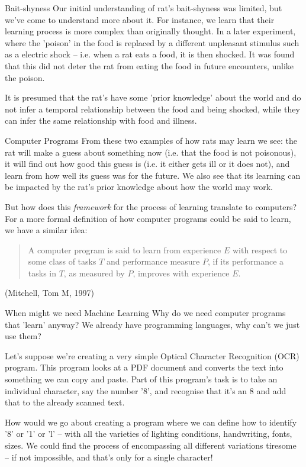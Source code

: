 \documentclass[10pt]{beamer}
\begin{document}
\begin{frame}[label={sec:orga29acbd}]{Bait-shyness}
Our initial understanding of rat's bait-shyness was limited, but we've come to
understand more about it. For instance, we learn that their learning process is more
complex than originally thought. In a later experiment, where the 'poison' in the
food is replaced by a different unpleasant stimulus such as a electric shock --
i.e. when a rat eats a food, it is then shocked. It was found that this did not
deter the rat from eating the food in future encounters, unlike the poison.

It is presumed that the rat's have some 'prior knowledge' about the world and do not
infer a temporal relationship between the food and being shocked, while they can
infer the same relationship with food and illness.
\end{frame}

\begin{frame}[label={sec:org61f7819}]{Computer Programs}
From these two examples of how rats may learn we see: the rat will make a guess about
something now (i.e. that the food is not poisonous), it will find out how good this
guess is (i.e. it either gets ill or it does not), and learn from how well its guess
was for the future. We also see that its learning can be impacted by the rat's prior
knowledge about how the world may work.

But how does this \emph{framework} for the process of learning translate to computers? For a
more formal definition of how computer programs could be said to learn, we have a
similar idea:

\begin{quote}
A computer program is said to learn from experience \(E\) with respect
to some class of tasks \(T\) and performance measure \(P\), if its performance
a tasks in \(T\), as measured by \(P\), improves with experience \(E\).
\end{quote}

(Mitchell, Tom M, 1997)
\end{frame}

\begin{frame}[label={sec:org7779646}]{When might we need Machine Learning}
Why do we need computer programs that 'learn' anyway? We already have programming
languages, why can't we just use them?

Let's suppose we're creating a very simple Optical Character Recognition (OCR)
program. This program looks at a PDF document and converts the text into something we
can copy and paste. Part of this program's task is to take an individual character,
say the number '8', and recognise that it's an 8 and add that to the already scanned
text.

How would we go about creating a program where we can define how to identify '8' or
'1' or 'l' -- with all the varieties of lighting conditions, handwriting, fonts,
sizes. We could find the process of encompassing all different variations tiresome --
if not impossible, and that's only for a single character!
\end{frame}
\end{document}
